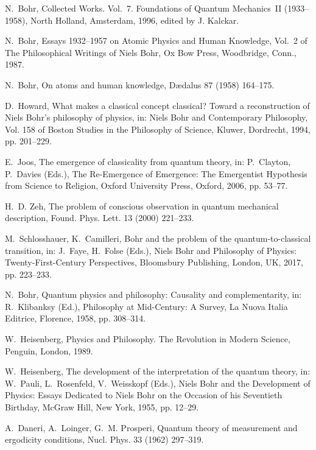 \documentclass[3p,sort&compress,12pt]{elsarticle}
\begin{document}
\begin{thebibliography}{100}
N.~Bohr, Collected {W}orks. {V}ol.~7. Foundations of Quantum Mechanics~II
  (1933--1958), North Holland, Amsterdam, 1996, edited by J. Kalckar.

N.~Bohr, Essays 1932--1957 on Atomic Physics and Human Knowledge, Vol.~2 of The
  Philosophical Writings of Niels Bohr, Ox Bow Press, Woodbridge, Conn., 1987.

N.~Bohr, On atoms and human knowledge, D{\ae}dalus 87 (1958) 164--175.

D.~Howard, What makes a classical concept classical? {T}oward a reconstruction
  of {N}iels {B}ohr's philosophy of physics, in: Niels Bohr and Contemporary
  Philosophy, Vol. 158 of Boston Studies in the Philosophy of Science, Kluwer,
  Dordrecht, 1994, pp. 201--229.

E.~Joos, The emergence of classicality from quantum theory, in: P.~Clayton,
  P.~Davies (Eds.), The Re-Emergence of Emergence: The Emergentist Hypothesis
  from Science to Religion, Oxford University Press, Oxford, 2006, pp. 53--77.

H.~D. Zeh, The problem of conscious observation in quantum mechanical
  description, Found. Phys. Lett. 13 (2000) 221--233.

M.~Schlosshauer, K.~Camilleri, Bohr and the problem of the quantum-to-classical
  transition, in: J.~Faye, H.~Folse (Eds.), Niels Bohr and Philosophy of
  Physics: Twenty-First-Century Perspectives, Bloomsbury Publishing, London,
  UK, 2017, pp. 223--233.

N.~Bohr, Quantum physics and philosophy: Causality and complementarity, in:
  R.~Klibanksy (Ed.), Philosophy at Mid-Century: A Survey, La Nuova Italia
  Editrice, Florence, 1958, pp. 308--314.

W.~Heisenberg, Physics and Philosophy. The Revolution in Modern Science,
  Penguin, London, 1989.

W.~Heisenberg, The development of the interpretation of the quantum theory, in:
  W.~Pauli, L.~Rosenfeld, V.~Weisskopf (Eds.), Niels Bohr and the Development
  of Physics: Essays Dedicated to Niels Bohr on the Occasion of his Seventieth
  Birthday, McGraw Hill, New York, 1955, pp. 12--29.

A.~Daneri, A.~Loinger, G.~M. Prosperi, Quantum theory of measurement and
  ergodicity conditions, Nucl. Phys. 33 (1962) 297--319.


\end{thebibliography}
\end{document}
